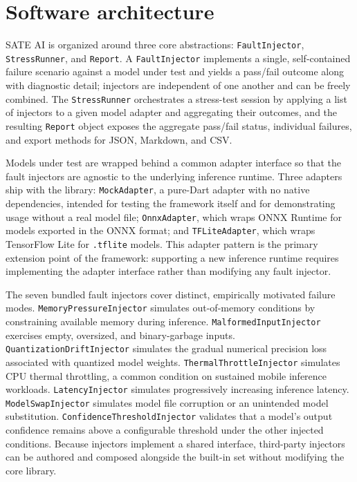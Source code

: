 \documentclass[
  11pt,
]{article}
\begin{document}
\hypertarget{software-architecture}{%
\section{Software architecture}\label{software-architecture}}

SATE AI is organized around three core abstractions:
\texttt{FaultInjector}, \texttt{StressRunner}, and \texttt{Report}. A
\texttt{FaultInjector} implements a single, self-contained failure
scenario against a model under test and yields a pass/fail outcome along
with diagnostic detail; injectors are independent of one another and can
be freely combined. The \texttt{StressRunner} orchestrates a stress-test
session by applying a list of injectors to a given model adapter and
aggregating their outcomes, and the resulting \texttt{Report} object
exposes the aggregate pass/fail status, individual failures, and export
methods for JSON, Markdown, and CSV.

Models under test are wrapped behind a common adapter interface so that
the fault injectors are agnostic to the underlying inference runtime.
Three adapters ship with the library: \texttt{MockAdapter}, a pure-Dart
adapter with no native dependencies, intended for testing the framework
itself and for demonstrating usage without a real model file;
\texttt{OnnxAdapter}, which wraps ONNX Runtime for models exported in
the ONNX format; and \texttt{TFLiteAdapter}, which wraps TensorFlow Lite
for \texttt{.tflite} models. This adapter pattern is the primary
extension point of the framework: supporting a new inference runtime
requires implementing the adapter interface rather than modifying any
fault injector.

The seven bundled fault injectors cover distinct, empirically motivated
failure modes. \texttt{MemoryPressureInjector} simulates out-of-memory
conditions by constraining available memory during inference.
\texttt{MalformedInputInjector} exercises empty, oversized, and
binary-garbage inputs. \texttt{QuantizationDriftInjector} simulates the
gradual numerical precision loss associated with quantized model
weights. \texttt{ThermalThrottleInjector} simulates CPU thermal
throttling, a common condition on sustained mobile inference workloads.
\texttt{LatencyInjector} simulates progressively increasing inference
latency. \texttt{ModelSwapInjector} simulates model file corruption or
an unintended model substitution. \texttt{ConfidenceThresholdInjector}
validates that a model's output confidence remains above a configurable
threshold under the other injected conditions. Because injectors
implement a shared interface, third-party injectors can be authored and
composed alongside the built-in set without modifying the core library.
\end{document}
